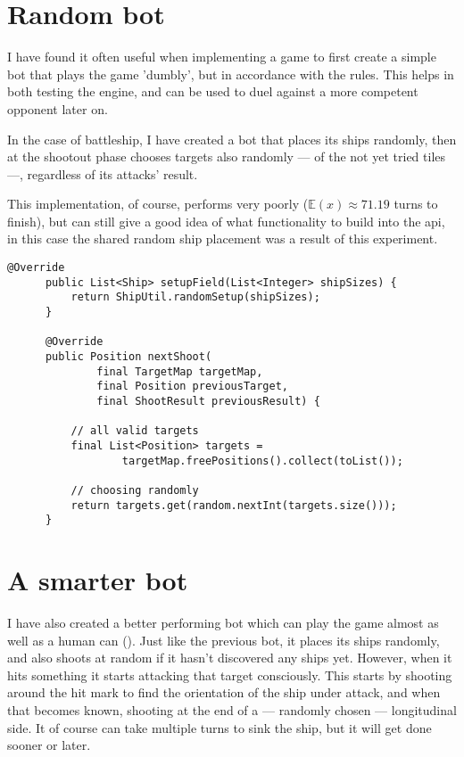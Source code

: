 		\section{Random bot}
		
		I have found it often useful when implementing a game to first create a simple bot that plays the game 'dumbly', but in accordance with the rules. This helps in both testing the engine, and can be used to duel against a more competent opponent later on.
		
		In the case of battleship, I have created a bot that places its ships randomly, then at the shootout phase chooses targets also randomly --- of the not yet tried tiles ---, regardless of its attacks' result.
		
		This implementation, of course, performs very poorly ($\mathbb{E}(x) \approx 71.19$ turns to finish), but can still give a good idea of what functionality to build into the api, in this case the shared random ship placement was a result of this experiment.
		
		\begin{center}
		\begin{minipage}{13cm}
		\begin{lstlisting}[title={\code{RandomBot.java}}]
	  @Override
      public List<Ship> setupField(List<Integer> shipSizes) {
          return ShipUtil.randomSetup(shipSizes);
      }

      @Override
      public Position nextShoot(
    	  	  final TargetMap targetMap,
    		  final Position previousTarget,
    		  final ShootResult previousResult) {
    		
    	  // all valid targets
          final List<Position> targets =
        		  targetMap.freePositions().collect(toList());
        		
          // choosing randomly
          return targets.get(random.nextInt(targets.size()));
      }
		\end{lstlisting}
			\end{minipage}
		\end{center}
		\section{A smarter bot}

		I have also created a better performing bot which can play the game almost as well as a human can (). Just like the previous bot, it places its ships randomly, and also shoots at random if it hasn't discovered any ships yet. However, when it hits something it starts attacking that target consciously. This starts by shooting around the hit mark to find the orientation of the ship under attack, and when that becomes known, shooting at the end of a --- randomly chosen --- longitudinal side. It of course can take multiple turns to sink the ship, but it will get done sooner or later.
		
